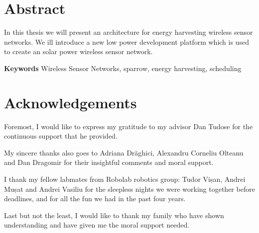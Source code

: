 \chapter*{Abstract}

In this thesis we will present an architecture for energy harvesting wireless sensor networks. We
ill introduce a new low power development platform which is used to create an solar power wireless
sensor network.



\textbf{Keywords} Wireless Sensor Networks, sparrow, energy harvesting, scheduling

\chapter*{Acknowledgements}

Foremost, I would like to express my gratitude to my advisor Dan Tudose for the continuous support that he provided.


My sincere thanks also goes to Adriana Drăghici, Alexandru Corneliu Olteanu and Dan Dragomir for their insightful comments  and moral support.

I thank my fellow labmates from Robolab robotics group: Tudor Vișan, Andrei Mușat and Andrei Vasiliu for the sleepless nights we were working together before deadlines, and for all the fun we had in the past four years.

Last but not the least, I would like to thank my family who have shown understanding and have given me the moral support needed.

